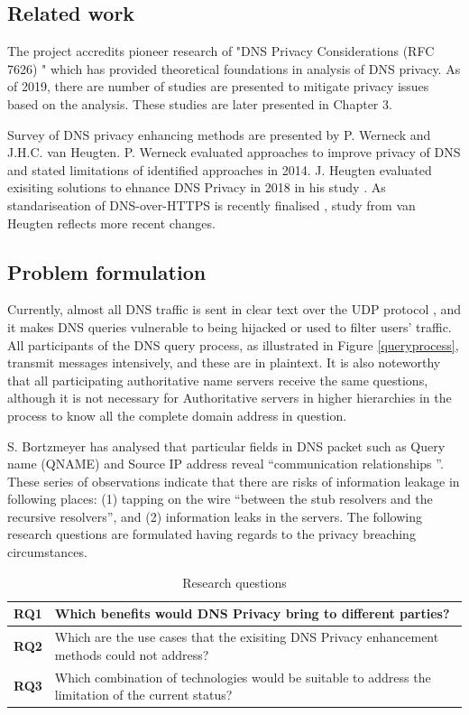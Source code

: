 \documentclass[a4paper,12pt]{article}
\begin{document}
\subsection{Related work}
The project accredits pioneer research of "DNS Privacy Considerations (RFC 7626) \cite{rfc7626}" which has provided theoretical foundations in analysis of DNS privacy. 
As of 2019, there are number of studies are presented to mitigate privacy issues based on the analysis. These studies are later presented in Chapter 3.

Survey of DNS privacy enhancing methods are presented by P. Werneck and J.H.C. van Heugten. P. Werneck evaluated approaches to improve privacy of DNS and stated limitations of identified approaches \cite{werneck2014dns} in 2014. J. Heugten evaluated exisiting solutions to ehnance DNS Privacy in 2018 in his study \cite{van2018privacy}. As standariseation of DNS-over-HTTPS is recently finalised \cite{rfc8484}, study from van Heugten reflects more recent changes.

\subsection{Problem formulation}\label{problemformulation}
Currently, almost all DNS traffic is sent in clear text \cite{rfc7626} over the UDP protocol \cite{tcp2014analysis}, and it makes DNS queries vulnerable to being hijacked or used to filter users' traffic.
All participants of the DNS query process, as illustrated in Figure \ref{queryprocess}, transmit messages intensively, and these are in plaintext.
It is also noteworthy that all participating authoritative name servers receive the same questions, although it is not necessary for Authoritative servers in higher hierarchies in the process to know all the complete domain address in question.

S. Bortzmeyer has analysed that particular fields in DNS packet \cite{rfc1035} such as Query name (QNAME) and Source IP address reveal ``communication relationships \cite{rfc7626}''.
These series of observations indicate that there are risks of information leakage in following places: (1) tapping on the wire ``between the stub resolvers and the recursive resolvers'', and (2) information leaks in the servers.
The following research questions are formulated having regards to the privacy breaching circumstances.

\begin{table}[h!]
    \begin{tabular} {|p{1.2cm}|p{12.8cm}|} \hline
        \textbf{RQ1} & Which benefits would DNS Privacy bring to different parties? \\ \hline
        \textbf{RQ2} & Which are the use cases that the exisiting DNS Privacy enhancement methods could not address? \\ \hline
        \textbf{RQ3} & Which combination of technologies would be suitable to address the limitation of the current status?\\ \hline
    \end{tabular}
    \caption{Research questions}
\label{researchquestions}
\end{table}
\end{document}
